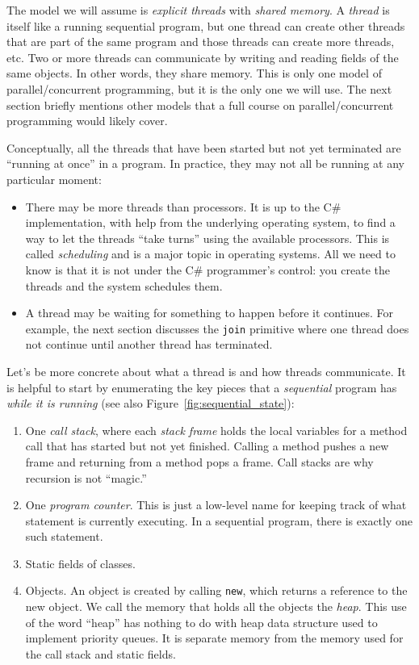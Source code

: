 \documentclass[10pt]{article}
\begin{document}
The model we will assume is \emph{explicit threads} with \emph{shared
  memory}.  A \emph{thread} is itself like a running sequential
program, but one thread can create other threads that are part of the
same program and those threads can create more threads, etc.  Two or
more threads can communicate by writing and reading fields
of the same objects.  In other words, they share memory.  This is only
one model of parallel/concurrent programming, but it is the only one we
will use.  The next section briefly mentions other models that
a full course on parallel/concurrent programming would likely cover.

Conceptually, all the threads that have been started but not yet
terminated are ``running at once'' in a program.  In practice, they
may not all be running at any particular moment:
\begin{itemize}
\item There may be more threads than processors.  It is up to the C\#
  implementation, with help from the underlying operating system, to
  find a way to let the threads ``take turns'' using the available
  processors.  This is called \emph{scheduling} and is a major topic
  in operating systems.  All we need to know is that it is not under
  the C\# programmer's control: you create the threads and the system
  schedules them.
\item A thread may be waiting for something to happen before it
  continues.  For example, the next section discusses the {\tt join}
  primitive where one thread does not continue until another thread
  has terminated.
\end{itemize}

Let's be more concrete about what a thread is and how threads
communicate.  It is helpful to start by enumerating the key pieces that
a \emph{sequential} program has \emph{while it is running} (see
also Figure~\ref{fig:sequential_state}):
\begin{enumerate}
\item One \emph{call stack}, where each \emph{stack frame} holds the
  local variables for a method call that has started but not yet
  finished.  Calling a method pushes a new frame and returning from a
  method pops a frame.  Call stacks are why recursion is not
  ``magic.''
\item One \emph{program counter}.  This is just a low-level name for
  keeping track of what statement is currently executing.  In a
  sequential program, there is exactly one such statement.
\item Static fields of classes.
\item Objects.  An object is created by calling {\tt new}, which
  returns a reference to the new object.  We call the memory that holds all
  the objects the \emph{heap}.  This use of the word ``heap''
  has nothing to do with heap data structure used to implement
  priority queues.  It is separate memory from the memory used for the
  call stack and static fields.
\end{enumerate}
\end{document}
